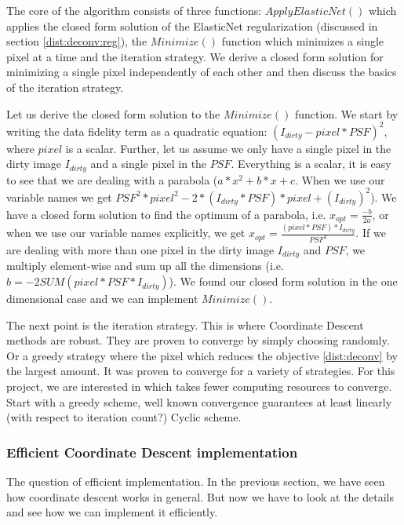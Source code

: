 The core of the algorithm consists of three functions: $ApplyElasticNet()$ which applies the closed form solution of the ElasticNet regularization (discussed in section \ref{dist:deconv:reg}), the $Minimize()$ function which minimizes a single pixel at a time and the iteration strategy. We derive a closed form solution for minimizing a single pixel independently of each other and then discuss the basics of the iteration strategy.

Let us derive the closed form solution to the $Minimize()$ function. We start by writing the data fidelity term as a quadratic equation: $(I_{dirty} - pixel * PSF)^2$, where $pixel$ is a scalar. Further, let us assume we only have a single pixel in the dirty image $I_{dirty}$ and a single pixel in the $PSF$. Everything is a scalar, it is easy to see that we are dealing with a parabola ($a*x^2 + b*x + c$. When we use our variable names we get $PSF^2 * pixel^2 - 2*(I_{dirty}*PSF)*pixel + (I_{dirty})^2$). We have a closed form solution to find the optimum of a parabola, i.e. $x_{opt} = \frac{-b}{2a}$, or when we use our variable names explicitly, we get $x_{opt} = \frac{(pixel*PSF)*I_{dirty}}{PSF^2}$. If we are dealing with more than one pixel in the dirty image $I_{dirty}$ and $PSF$, we multiply element-wise and sum up all the dimensions (i.e. $b = -2 SUM(pixel*PSF*I_{dirty})$). We found our closed form solution in the one dimensional case and we can implement $Minimize()$.

The next point is the iteration strategy. This is where Coordinate Descent methods are robust. They are proven to converge by simply choosing randomly. Or a greedy strategy where the pixel which reduces the objective \eqref{dist:deconv} by the largest amount. It was proven to converge for a variety of strategies. For this project, we are interested in which takes fewer computing resources to converge. 
Start with a greedy scheme, well known convergence guarantees at least linearly (with respect to iteration count?)\cite{luo1992convergence}
Cyclic scheme.

\subsubsection{Efficient Coordinate Descent implementation}\label{dist:deconv:efficient}
The question of efficient implementation. In the previous section, we have seen how coordinate descent works in general. But now we have to look at the details and see how we can implement it efficiently.

